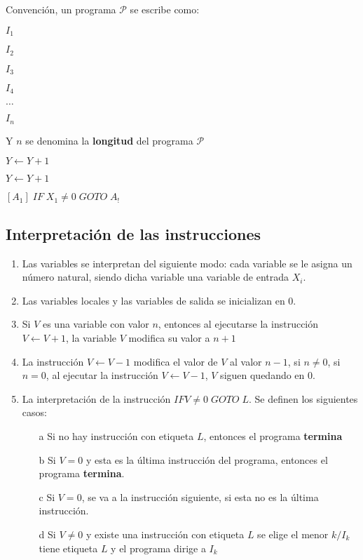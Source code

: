 \begin{observation}
Convenci\'on, un programa $\mathcal{P}$ se escribe como:
 
$I_1$
 
$I_2$
 
$I_3$
 
$I_4$
 
$\ldots$
 
$I_n$
 
Y $n$ se denomina la \textbf{longitud} del programa $\mathcal{P}$
 
\end{observation}
 
\begin{example}
$Y \leftarrow Y + 1$
 
$Y \leftarrow Y + 1$
\end{example}
 
\begin{example}
$[A_1] \; IF \; X_1 \neq 0 \; GOTO \; A_!$
\end{example}
 
\subsection{Interpretaci\'on de las instrucciones}
 
\begin{enumerate}
	\item Las variables se interpretan del siguiente modo: cada variable se le asigna un n\'umero natural, siendo dicha variable una variable de entrada $X_i$.
	\item Las variables locales y las variables de salida se inicializan en 0.
	\item Si $V$ es una variable con valor $n$, entonces al ejecutarse la instrucci\'on $V \leftarrow V + 1$, la variable $V$ modifica su valor a $n + 1$
	\item La instrucci\'on $V \leftarrow V - 1$ modifica el valor de $V$ al valor $n -1$, si $n \neq 0$, si $n = 0$, al ejecutar la instrucci\'on $V \leftarrow V - 1$, $V$ siguen quedando en 0.
	\item La interpretaci\'on de la instrucci\'on $IF V \neq 0 \; GOTO \; L$. Se definen los siguientes casos:
	\begin{enumerate}
		\item[a] Si no hay instrucci\'on con etiqueta $L$, entonces el programa \textbf{termina}
		\item[b] Si $V = 0$ y esta es la \'ultima instrucci\'on del programa, entonces el programa \textbf{termina}.
		\item[c] Si $V = 0$, se va a la instrucci\'on siguiente, si esta no es la \'ultima instrucci\'on.
		\item[d] Si $V \neq 0$ y existe una instrucci\'on con etiqueta $L$ se elige el menor $k / I_{k}$ tiene etiqueta $L$ y el programa dirige a $I_{k}$ 
	\end{enumerate}
\end{enumerate}
 

